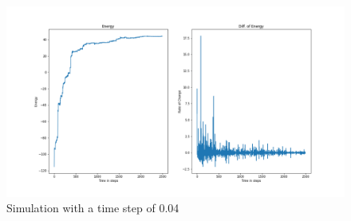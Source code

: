 \begin{figure}[!h]
	\begin{center}
		\includegraphics[scale= 1]{Figure/plot_04.png}
	\end{center}
	\caption[Simulation]{Simulation with a time step of 0.04 }
	\label{Plot04}
\end{figure}
